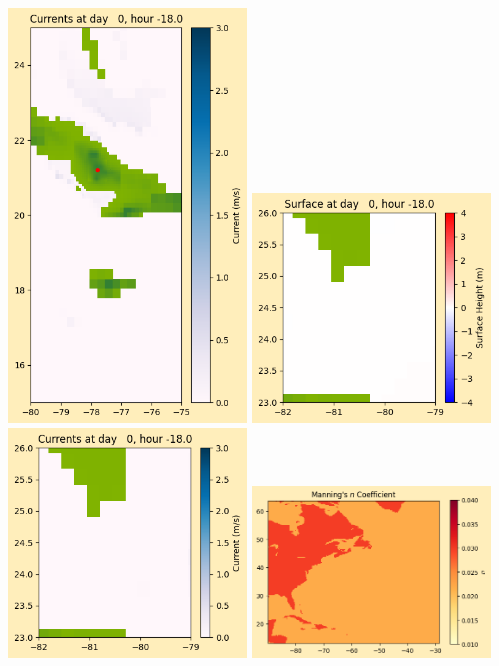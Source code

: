 \documentclass[11pt]{article}
\begin{document}
\includegraphics[width=0.475\textwidth]{frame0009fig1008.png}
\vskip 10pt 
\includegraphics[width=0.475\textwidth]{frame0009fig1009.png}
\includegraphics[width=0.475\textwidth]{frame0009fig1010.png}
\vskip 10pt 
\includegraphics[width=0.475\textwidth]{frame0009fig1011.png}
\end{document}
